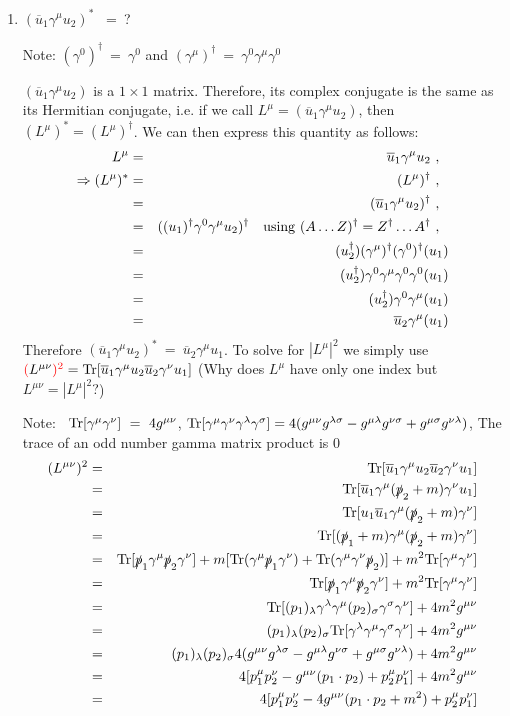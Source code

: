 \documentclass[12pt]{article}
\def \bea{\begin{eqnarray}}
\def \eea{\end{eqnarray}}
\def \Tr{{\rm Tr}}
\def \nn{\nonumber}
\def \nl{\nn \\}
\def \ou{\overline{u}}
\def \ga{\gamma}
\def \la{\lambda}
\def \si{\sigma}
\def \cre{\color{red}}
\def \cgr{\color{green}}
\begin{document}
\begin{enumerate}

\item$(\ou_1\ga^\mu u_2)^*$ ~=~?

Note: $(\ga^0)^\dag~=~\ga^0$ and $(\ga^\mu)^\dag~=~ \ga^0\ga^\mu\ga^0$

$(\ou_1\ga^\mu u_2)$ is a $1\times1$ matrix. Therefore, its complex conjugate is the same as its Hermitian conjugate, i.e. if we call
$L^\mu = (\ou_1\ga^\mu u_2)$, then $(L^\mu)^* = (L^\mu)^\dag$. We can then express this quantity as follows:
\bea
L^\mu &=& \ou_1\ga^\mu u_2 ~,~~ \nl
\Rightarrow (L^\mu)^* &=& (L^\mu)^\dag ~,~~ \nl
&=& (\ou_1\ga^\mu u_2)^\dag ~,~~ \nl
&=& ((u_1)^\dag\ga^0\ga^\mu u_2)^\dag ~~~{\rm using}~(A\ldots Z)^\dag = Z^\dag\ldots A^\dag ~,~~ \nl
&=& (u_2^\dag)(\ga^\mu)^\dag(\ga^0)^\dag(u_1)\nl
&=& (u_2^\dag)\ga^0\ga^\mu\ga^0\ga^0(u_1)\nl
&=& (u_2^\dag)\ga^0\ga^\mu(u_1)\nl
&=& \ou_2\ga^\mu(u_1)
\eea
Therefore $(\ou_1\ga^\mu u_2)^*~=~\ou_2\ga^\mu u_1 $. To solve for $|L^\mu|^2$ we simply use ${\cre (}L^{\mu\nu}{\cre)^2} = \Tr[\ou_1 \ga^\mu u_2 \ou_2 \ga^\nu u_1]$ ({\cgr Why does $L^\mu$ have only one index but $L^{\mu\nu} = |L^\mu|^2$?})

Note: ~$\Tr[\ga^\mu\ga^\nu]~=~4 g^{\mu\nu}$, $\Tr[\ga^\mu \ga^\nu \ga^\la \ga^\si]= 4(g^{\mu\nu}g^{\la\si} - g^{\mu\la} g^{\nu\si} + g^{\mu\si}g^{\nu\la})$, The trace of an odd number gamma matrix product is 0
\bea
(L^{\mu\nu})^2 &=& \Tr[\ou_1 \ga^\mu u_2 \ou_2 \ga^\nu u_1] \\\nonumber
&=& \Tr[\ou_1 \ga^\mu (\slashed{p}_2+m) \ga^\nu u_1]\nl\nonumber
&=& \Tr[u_1\ou_1 \ga^\mu (\slashed{p}_2+m) \ga^\nu]\nl\nonumber
&=& \Tr[(\slashed{p}_1+m) \ga^\mu (\slashed{p}_2+m) \ga^\nu]\nl\nonumber
&=& \Tr[\slashed{p}_1\ga^\mu \slashed{p}_2 \ga^\nu] + m[\Tr(\ga^\mu \slashed{p}_1\ga^\nu) + \Tr(\ga^\mu \ga^\nu \slashed{p}_2)] + m^2\Tr[\ga^\mu \ga^\nu]\nl\nonumber
&=& \Tr[\slashed{p}_1\ga^\mu \slashed{p}_2 \ga^\nu] + m^2\Tr[\ga^\mu \ga^\nu]\nl\nonumber
&=& \Tr[(p_1)_\la\ga^\la \ga^\mu (p_2)_\si\ga^\si \ga^\nu  ] + 4m^2g^{\mu\nu}\nl\nonumber
&=& (p_1)_\la (p_2)_\si \Tr[\ga^\la \ga^\mu\ga^\si \ga^\nu  ] + 4m^2g^{\mu\nu}\nl\nonumber
&=& (p_1)_\la(p_2)_\si 4(g^{\mu\nu}g^{\la\si} - g^{\mu\la} g^{\nu\si} + g^{\mu\si}g^{\nu\la}) + 4m^2g^{\mu\nu}\nl\nonumber
&=& 4[p_1^\mu p_2^\nu - g^{\mu\nu}(p_1 \cdot p_2) + p_2^\mu p_1^\nu] + 4m^2g^{\mu\nu} \nl
&=& 4[p_1^\mu p_2^\nu - 4g^{\mu\nu}(p_1 \cdot p_2 + m^2) + p_2^\mu p_1^\nu]
\eea


\end{enumerate}
\end{document}
